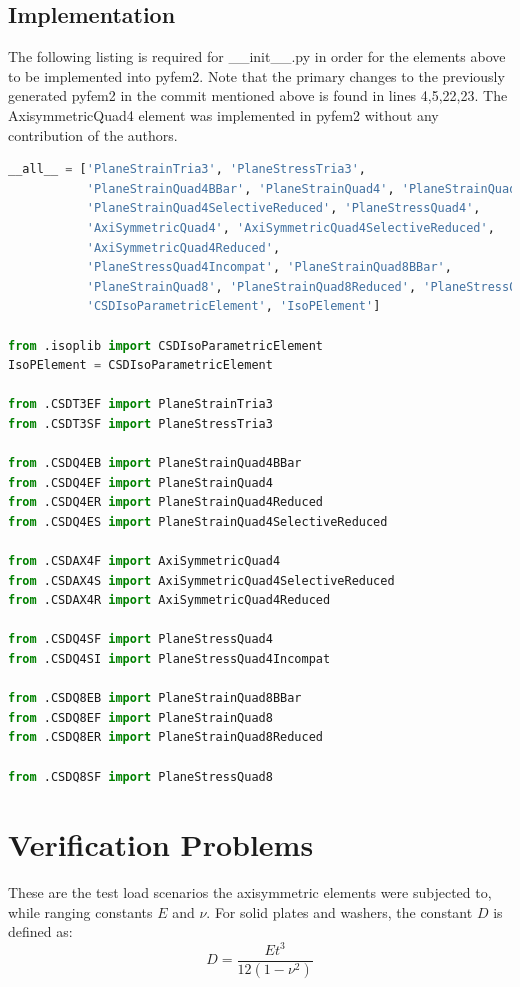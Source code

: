\documentclass[10pt,letterpaper]{report}
\numberwithin{equation}{chapter}
\begin{document}
\section{Implementation}
The following listing is required for \_\_init\_\_.py in order for the elements above to be implemented into pyfem2. Note that the primary changes to the previously generated pyfem2 in the commit mentioned above is found in lines 4,5,22,23. The AxisymmetricQuad4 element was implemented in pyfem2 without any contribution of the authors.
\begin{lstlisting}[language=Python]
__all__ = ['PlaneStrainTria3', 'PlaneStressTria3',
           'PlaneStrainQuad4BBar', 'PlaneStrainQuad4', 'PlaneStrainQuad4Reduced',
           'PlaneStrainQuad4SelectiveReduced', 'PlaneStressQuad4',
           'AxiSymmetricQuad4', 'AxiSymmetricQuad4SelectiveReduced',
           'AxiSymmetricQuad4Reduced',
           'PlaneStressQuad4Incompat', 'PlaneStrainQuad8BBar',
           'PlaneStrainQuad8', 'PlaneStrainQuad8Reduced', 'PlaneStressQuad8',
           'CSDIsoParametricElement', 'IsoPElement']

from .isoplib import CSDIsoParametricElement
IsoPElement = CSDIsoParametricElement

from .CSDT3EF import PlaneStrainTria3
from .CSDT3SF import PlaneStressTria3

from .CSDQ4EB import PlaneStrainQuad4BBar
from .CSDQ4EF import PlaneStrainQuad4
from .CSDQ4ER import PlaneStrainQuad4Reduced
from .CSDQ4ES import PlaneStrainQuad4SelectiveReduced

from .CSDAX4F import AxiSymmetricQuad4
from .CSDAX4S import AxiSymmetricQuad4SelectiveReduced
from .CSDAX4R import AxiSymmetricQuad4Reduced

from .CSDQ4SF import PlaneStressQuad4
from .CSDQ4SI import PlaneStressQuad4Incompat

from .CSDQ8EB import PlaneStrainQuad8BBar
from .CSDQ8EF import PlaneStrainQuad8
from .CSDQ8ER import PlaneStrainQuad8Reduced

from .CSDQ8SF import PlaneStressQuad8
\end{lstlisting}







\chapter{Verification Problems}
\label{ch:VerProb}
These are the test load scenarios the axisymmetric elements were subjected to, while ranging constants $E$ and $\nu$.
For solid plates and washers, the constant $D$ is defined as:
\[D = \frac{Et^3}{12(1- \nu ^2)}\]
\end{document}

